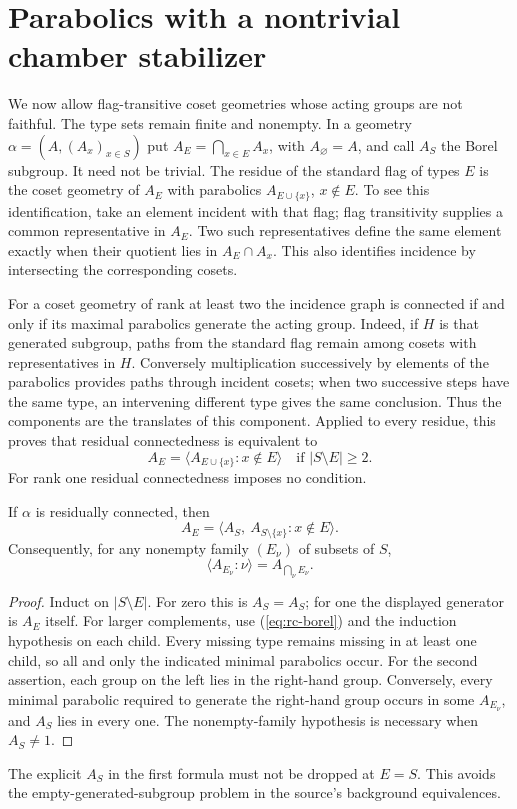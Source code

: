 \section{Parabolics with a nontrivial chamber stabilizer}
We now allow flag-transitive coset geometries whose acting groups are not
faithful. The type sets remain finite and nonempty. In a geometry
$\alpha=(A,(A_x)_{x\in S})$ put $A_E=\bigcap_{x\in E}A_x$, with
$A_\varnothing=A$, and call $A_S$ the Borel subgroup. It need not be
trivial. The residue of the standard flag of types $E$ is the coset
geometry of $A_E$ with parabolics $A_{E\cup\{x\}}$, $x\notin E$.
To see this identification, take an element incident with that flag;
flag transitivity supplies a common representative in $A_E$. Two such
representatives define the same element exactly when their quotient
lies in $A_E\cap A_x$. This also identifies incidence by intersecting
the corresponding cosets.

For a coset geometry of rank at least two the incidence graph is
connected if and only if its maximal parabolics generate the acting
group. Indeed, if $H$ is that generated subgroup, paths from the
standard flag remain among cosets with representatives in $H$.
Conversely multiplication successively by elements of the parabolics
provides paths through incident cosets; when two successive steps have
the same type, an intervening different type gives the same conclusion.
Thus the components are the translates of this component. Applied to
every residue, this proves that residual connectedness is equivalent to
\begin{equation}\label{eq:rc-borel}
 A_E=\langle A_{E\cup\{x\}}:x\notin E\rangle
 \quad\text{if }|S\setminus E|\geq2.
\end{equation}
For rank one residual connectedness imposes no condition.

\begin{lemma}\label{lem:parabolic-join}
If $\alpha$ is residually connected, then
\[
 A_E=\langle A_S,\ A_{S\setminus\{x\}}:x\notin E\rangle.
\]
Consequently, for any nonempty family $(E_\nu)$ of subsets of $S$,
\begin{equation}\label{eq:parabolic-join}
 \langle A_{E_\nu}:\nu\rangle=A_{\bigcap_\nu E_\nu}.
\end{equation}
\end{lemma}
\begin{proof}
Induct on $|S\setminus E|$. For zero this is $A_S=A_S$; for one
the displayed generator is $A_E$ itself. For larger complements,
use (\ref{eq:rc-borel}) and the induction hypothesis on each child.
Every missing type remains missing in at least one child, so all and
only the indicated minimal parabolics occur. For the second assertion,
each group on the left lies in the right-hand group. Conversely, every
minimal parabolic required to generate the right-hand group occurs
in some $A_{E_\nu}$, and $A_S$ lies in every one. The nonempty-family
hypothesis is necessary when $A_S\ne1$.
\end{proof}
The explicit $A_S$ in the first formula must not be dropped at
$E=S$. This avoids the empty-generated-subgroup problem in the
source's background equivalences.

